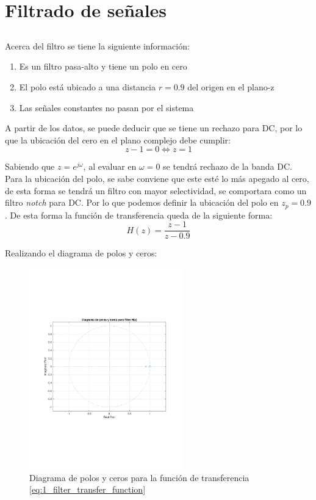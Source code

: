\section{Filtrado de señales}
	\subsection{}
		Acerca del filtro se tiene la siguiente información:
		\begin{enumerate}
			\item Es un filtro pasa-alto y tiene un polo en cero
			\item El polo está ubicado a una distancia $r = 0.9$ del origen en el plano-z
			\item Las señales constantes no pasan por el sistema
		\end{enumerate}
		
		A partir de los datos, se puede deducir que se tiene un rechazo para DC, por lo que la ubicación del cero en el plano complejo debe cumplir:
		\begin{equation*}
			z - 1 = 0 \Longleftrightarrow z = 1
		\end{equation*}
		
		Sabiendo que $z = e^{j\omega}$, al evaluar en $\omega = 0$ se tendrá rechazo de la banda DC. Para la ubicación del polo, se sabe conviene que este esté lo más apegado al cero, de esta forma se tendrá un filtro con mayor selectividad, se comportara como un filtro \textit{notch} 	para DC. Por lo que podemos definir la ubicación del polo en $z_{p} = 0.9$. De esta forma la función de transferencia queda de la siguiente forma:
		\begin{equation}
		H(z) = \frac{z-1}{z-0.9}
		\label{eq:1_filter_transfer_function}
		\end{equation}
		
		Realizando el diagrama de polos y ceros:
		\begin{figure}[H]
			\center
			\includegraphics[width=0.6\textwidth,clip, trim = {1.9cm 6.8cm 2.3cm 7cm}]{../plots/1_zp_diag.pdf}
			\caption{Diagrama de polos y ceros para la función de transferencia \ref{eq:1_filter_transfer_function}}
			\label{fig:1_zero_pole_diagram}
		\end{figure}


